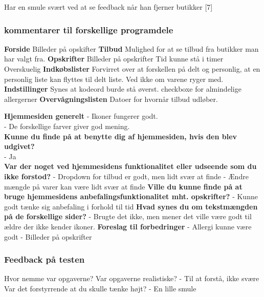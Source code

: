 Har en smule svært ved at se feedback når han fjerner butikker [7]


\subsubsection{kommentarer til forskellige programdele}
\textbf{Forside}
	Billeder på opskifter
\textbf{Tilbud}
	Mulighed for at se tilbud fra butikker man har valgt fra.
\textbf{Opskrifter}
	Billeder på opskrifter
	Tid kunne stå i timer
	Overskuelig
\textbf{Indkøbslister}
	Forvirret over at forskellen på delt og personlig, at en personlig liste kan flyttes til delt liste. Ved ikke om varene ryger med.
\textbf{Indstillinger}
Synes at kodeord burde stå øverst.
checkboxe for almindelige allergerner
\textbf{Overvågningslisten}
	Datoer for hvornår tilbud udløber.

\textbf{Hjemmesiden generelt}
 - Ikoner fungerer godt. \\
 - De forskellige farver giver god mening.\\
\textbf{Kunne du finde på at benytte dig af hjemmesiden, hvis den blev udgivet?}\\
 - Ja\\
\textbf{Var der noget ved hjemmesidens funktionalitet eller udseende som du ikke forstod?}
 - Dropdown for tilbud er godt, men lidt svær at finde
 - Ændre mængde på varer kan være lidt svær at finde
\textbf{Ville du kunne finde på at bruge hjemmesidens anbefalingsfunktionalitet mht. opskrifter?}
 - Kunne godt tænke sig anbefaling i forhold til tid
 \textbf{Hvad synes du om tekstmængden på de forskellige sider?}
 - Brugte det ikke, men mener det ville være godt til ældre der ikke kender ikoner.
\textbf{Foreslag til forbedringer}
 - Allergi kunne være godt
 - Billeder på opskrifter

\subsubsection{Feedback på testen}
Hvor nemme var opgaverne? Var opgaverne realistiske?
 - Til at forstå, ikke svære
Var det forstyrrende at du skulle tænke højt?
 - En lille smule


